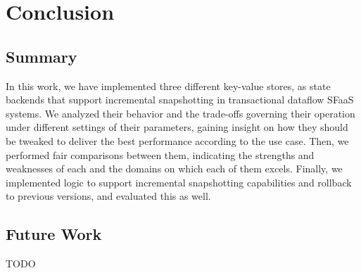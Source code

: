
\chapter{Conclusion}

\label{Chapter5-conclusion}

\section{Summary}

In this work, we have implemented three different key-value stores, as state backends that support incremental snapshotting in transactional dataflow SFaaS systems.
We analyzed their behavior and the trade-offs governing their operation under different settings of their parameters, gaining insight on how they should be tweaked to deliver the best performance according to the use case.
Then, we performed fair comparisons between them, indicating the strengths and weaknesses of each and the domains on which each of them excels.
Finally, we implemented logic to support incremental snapshotting capabilities and rollback to previous versions, and evaluated this as well.


\section{Future Work}

TODO


